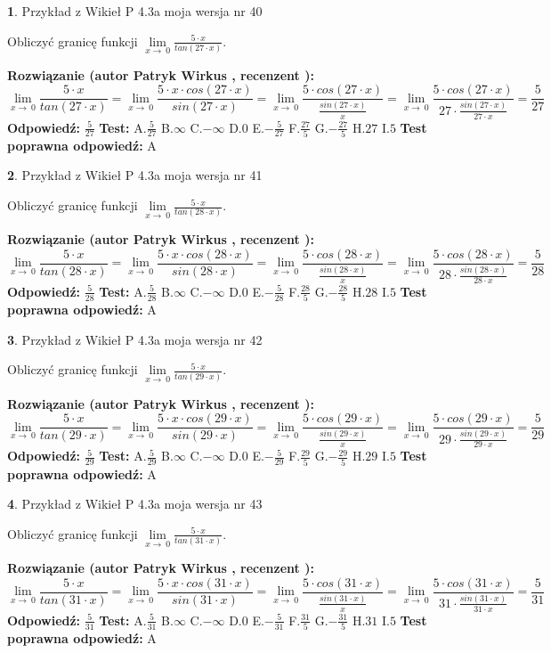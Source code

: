 \documentclass[12pt, a4paper]{article}
\theoremstyle{definition} %
\newtheorem{zad}{}
\newcommand{\zadStart}[1]{\begin{zad}#1\newline}
\newcommand{\zadStop}{\end{zad}}
\newcommand{\rozwStart}[2]{\noindent \textbf{Rozwiązanie (autor #1 , recenzent #2): }\newline}
\newcommand{\rozwStop}{\newline}
\newcommand{\odpStart}{\noindent \textbf{Odpowiedź:}\newline}
\newcommand{\odpStop}{\newline}
\newcommand{\testStart}{\noindent \textbf{Test:}\newline}
\newcommand{\testStop}{\newline}
\newcommand{\kluczStart}{\noindent \textbf{Test poprawna odpowiedź:}\newline}
\newcommand{\kluczStop}{\newline}
\begin{document}
\zadStart{Przykład z Wikieł P 4.3a moja wersja nr 40}


Obliczyć granicę funkcji $\lim\limits_{x\to\ 0}\frac{5 \cdot x}{tan(27 \cdot x)}$.
\zadStop
\rozwStart{Patryk Wirkus}{}
$$\lim\limits_{x\to\ 0}\frac{5 \cdot x}{tan(27 \cdot x)}=\lim\limits_{x\to\ 0}\frac{5 \cdot x \cdot cos(27 \cdot x)}{sin(27 \cdot x)}=\lim\limits_{x\to\ 0}\frac{5 \cdot cos(27 \cdot x)}{\frac{sin(27 \cdot x)}{x}}=\lim\limits_{x\to\ 0}\frac{5 \cdot cos(27 \cdot x)}{27 \cdot \frac{sin(27 \cdot x)}{27 \cdot x}} = \frac{5}{27}$$
\rozwStop
\odpStart
$\frac{5}{27}$
\odpStop
\testStart
A.$\frac{5}{27}$
B.$\infty$
C.$-\infty$
D.$0$
E.$-\frac{5}{27}$
F.$\frac{27}{5}$
G.$-\frac{27}{5}$
H.$27$
I.$5$
\testStop
\kluczStart
A
\kluczStop



\zadStart{Przykład z Wikieł P 4.3a moja wersja nr 41}


Obliczyć granicę funkcji $\lim\limits_{x\to\ 0}\frac{5 \cdot x}{tan(28 \cdot x)}$.
\zadStop
\rozwStart{Patryk Wirkus}{}
$$\lim\limits_{x\to\ 0}\frac{5 \cdot x}{tan(28 \cdot x)}=\lim\limits_{x\to\ 0}\frac{5 \cdot x \cdot cos(28 \cdot x)}{sin(28 \cdot x)}=\lim\limits_{x\to\ 0}\frac{5 \cdot cos(28 \cdot x)}{\frac{sin(28 \cdot x)}{x}}=\lim\limits_{x\to\ 0}\frac{5 \cdot cos(28 \cdot x)}{28 \cdot \frac{sin(28 \cdot x)}{28 \cdot x}} = \frac{5}{28}$$
\rozwStop
\odpStart
$\frac{5}{28}$
\odpStop
\testStart
A.$\frac{5}{28}$
B.$\infty$
C.$-\infty$
D.$0$
E.$-\frac{5}{28}$
F.$\frac{28}{5}$
G.$-\frac{28}{5}$
H.$28$
I.$5$
\testStop
\kluczStart
A
\kluczStop



\zadStart{Przykład z Wikieł P 4.3a moja wersja nr 42}


Obliczyć granicę funkcji $\lim\limits_{x\to\ 0}\frac{5 \cdot x}{tan(29 \cdot x)}$.
\zadStop
\rozwStart{Patryk Wirkus}{}
$$\lim\limits_{x\to\ 0}\frac{5 \cdot x}{tan(29 \cdot x)}=\lim\limits_{x\to\ 0}\frac{5 \cdot x \cdot cos(29 \cdot x)}{sin(29 \cdot x)}=\lim\limits_{x\to\ 0}\frac{5 \cdot cos(29 \cdot x)}{\frac{sin(29 \cdot x)}{x}}=\lim\limits_{x\to\ 0}\frac{5 \cdot cos(29 \cdot x)}{29 \cdot \frac{sin(29 \cdot x)}{29 \cdot x}} = \frac{5}{29}$$
\rozwStop
\odpStart
$\frac{5}{29}$
\odpStop
\testStart
A.$\frac{5}{29}$
B.$\infty$
C.$-\infty$
D.$0$
E.$-\frac{5}{29}$
F.$\frac{29}{5}$
G.$-\frac{29}{5}$
H.$29$
I.$5$
\testStop
\kluczStart
A
\kluczStop



\zadStart{Przykład z Wikieł P 4.3a moja wersja nr 43}


Obliczyć granicę funkcji $\lim\limits_{x\to\ 0}\frac{5 \cdot x}{tan(31 \cdot x)}$.
\zadStop
\rozwStart{Patryk Wirkus}{}
$$\lim\limits_{x\to\ 0}\frac{5 \cdot x}{tan(31 \cdot x)}=\lim\limits_{x\to\ 0}\frac{5 \cdot x \cdot cos(31 \cdot x)}{sin(31 \cdot x)}=\lim\limits_{x\to\ 0}\frac{5 \cdot cos(31 \cdot x)}{\frac{sin(31 \cdot x)}{x}}=\lim\limits_{x\to\ 0}\frac{5 \cdot cos(31 \cdot x)}{31 \cdot \frac{sin(31 \cdot x)}{31 \cdot x}} = \frac{5}{31}$$
\rozwStop
\odpStart
$\frac{5}{31}$
\odpStop
\testStart
A.$\frac{5}{31}$
B.$\infty$
C.$-\infty$
D.$0$
E.$-\frac{5}{31}$
F.$\frac{31}{5}$
G.$-\frac{31}{5}$
H.$31$
I.$5$
\testStop
\kluczStart
A
\kluczStop
\end{document}
